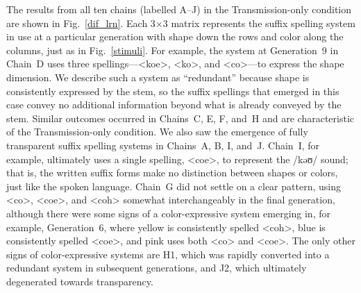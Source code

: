 \documentclass[doc,biblatex]{apa7}
\begin{document}
The results from all ten chains (labelled A--J) in the Transmission-only condition are shown in Fig.~\ref{dif_lrn}. Each 3×3 matrix represents the suffix spelling system in use at a particular generation with shape down the rows and color along the columns, just as in Fig.~\ref{stimuli}. For example, the system at Generation~9 in Chain~D uses three spellings---<koe>, <ko>, and <co>---to express the shape dimension. We describe such a system as ``redundant'' because shape is consistently expressed by the stem, so the suffix spellings that emerged in this case convey no additional information beyond what is already conveyed by the stem. Similar outcomes occurred in Chains~C, E, F, and~H and are characteristic of the Transmission-only condition. We also saw the emergence of fully transparent suffix spelling systems in Chains~A, B, I, and~J. Chain~I, for example, ultimately uses a single spelling, <coe>, to represent the /kəʊ/ sound; that is, the written suffix forms make no distinction between shapes or colors, just like the spoken language. Chain~G did not settle on a clear pattern, using <co>, <coe>, and <coh> somewhat interchangeably in the final generation, although there were some signs of a color-expressive system emerging in, for example, Generation~6, where yellow is consistently spelled <coh>, blue is consistently spelled <coe>, and pink uses both <co> and <coe>. The only other signs of color-expressive systems are H1, which was rapidly converted into a redundant system in subsequent generations, and J2, which ultimately degenerated towards transparency.
\end{document}
